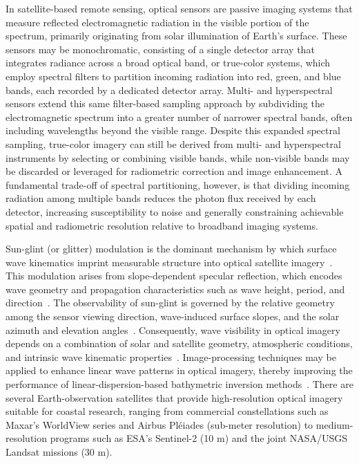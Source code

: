 \documentclass[12pt]{article}
\begin{document}
In satellite-based remote sensing, optical sensors are passive imaging systems that measure reflected electromagnetic radiation in the visible portion of the spectrum, primarily originating from solar illumination of Earth's surface. These sensors may be monochromatic, consisting of a single detector array that integrates radiance across a broad optical band, or true-color systems, which employ spectral filters to partition incoming radiation into red, green, and blue bands, each recorded by a dedicated detector array. Multi- and hyperspectral sensors extend this same filter-based sampling approach by subdividing the electromagnetic spectrum into a greater number of narrower spectral bands, often including wavelengths beyond the visible range. Despite this expanded spectral sampling, true-color imagery can still be derived from multi- and hyperspectral instruments by selecting or combining visible bands, while non-visible bands may be discarded or leveraged for radiometric correction and image enhancement. A fundamental trade-off of spectral partitioning, however, is that dividing incoming radiation among multiple bands reduces the photon flux received by each detector, increasing susceptibility to noise and generally constraining achievable spatial and radiometric resolution relative to broadband imaging systems.

Sun-glint (or glitter) modulation is the dominant mechanism by which surface wave kinematics imprint measurable structure into optical satellite imagery~\cite{Bergsma2019}. This modulation arises from slope-dependent specular reflection, which encodes wave geometry and propagation characteristics such as wave height, period, and direction~\cite{Bergsma2019}. The observability of sun-glint is governed by the relative geometry among the sensor viewing direction, wave-induced surface slopes, and the solar azimuth and elevation angles~\cite{Bergsma2019, Kudryavtsev2017}. Consequently, wave visibility in optical imagery depends on a combination of solar and satellite geometry, atmospheric conditions, and intrinsic wave kinematic properties~\cite{Bergsma2019}. Image-processing techniques may be applied to enhance linear wave patterns in optical imagery, thereby improving the performance of linear-dispersion-based bathymetric inversion methods~\cite{Bergsma2019}. There are several Earth-observation satellites that provide high-resolution optical imagery suitable for coastal research, ranging from commercial constellations such as Maxar's WorldView series and Airbus Pléiades (sub-meter resolution) to medium-resolution programs such as ESA's Sentinel-2 (10 m) and the joint NASA/USGS Landsat missions (30 m).
\end{document}
